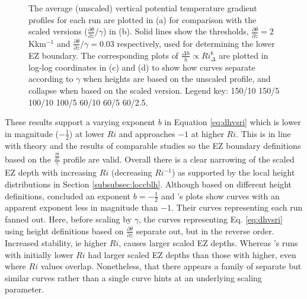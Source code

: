 \begin{figure}[htbp]
\begin{minipage}[b]{0.5\linewidth}
        \end{minipage}

        \caption{The average (unscaled) vertical potential temperature gradient profiles for each run are plotted in (a) for comparison with the scaled versions ($\frac{\partial \overline{\theta}}{\partial z}/\gamma$) in (b). Solid lines show the thresholds, $\frac{\partial \overline{\theta}}{\partial z}=2$Kkm$^{-1}$ and $\frac{\partial \overline{\theta}}{\partial z}/\gamma=0.03$ respectively, used for determining the lower EZ boundary.  The corresponding plots of $\frac{\Delta h}{h} \propto Ri_{\Delta} ^{b}$ are plotted in log-log coordinates in (c) and (d) to show how curves separate according to $\gamma$ when heights are based on the unscaled profile, and collapse when based on the scaled version.  Legend key:{\color{red} } 150/10  150/5 \hspace{2mm} {\color{black} } 100/10 \hspace{2mm} {\color{black} } 100/5 \hspace{2mm} {\color{offyellow} } 60/10 \hspace{2mm} {\color{offyellow} } 60/5 \hspace{2mm} {\color{offyellow} } 60/2.5.}
        \label{fig:scaleddeltahinvri}
\end{figure}


These results support a varying exponent $b$ in Equation \ref{eq:dhvsri} which is lower in magnitude ($-\frac{1}{2}$) at lower $Ri$ and approaches $-1$ at higher $Ri$.  This is in line with theory and the results of comparable studies so the EZ boundary definitions based on the $\frac{\frac{\partial \overline{\theta}}{\partial z}}{\gamma}$ profile are valid.  Overall there is a clear narrowing of the scaled EZ depth with increasing $Ri$ (decreasing $Ri^{-1}$) as supported by the local height distributions in Section \ref{subsubsec:loccblh}.  Although based on different height definitions, \cite{FedConzMir04} concluded an exponent $b = -\frac{1}{2}$ and \cite{BrooksFowler2}'s plots show curves with an apparent exponent less in magnitude than $-1$.  Their curves representing each run fanned out.  Here, before scaling by $\gamma$, the curves representing Eq. \ref{eq:dhvsri} using height definitions based on $\frac{\partial \overline{\theta}}{\partial z}$ separate out, but in the reverse order.  Increased stability, ie higher $Ri$, causes larger scaled EZ depths.  Whereas \cite{BrooksFowler2}'s runs with initially lower $Ri$ had larger scaled EZ depths than those with higher, even where $Ri$ values overlap. Nonetheless, that there appears a family of separate but similar curves rather than a single curve hints at an underlying scaling parameter.\\     

